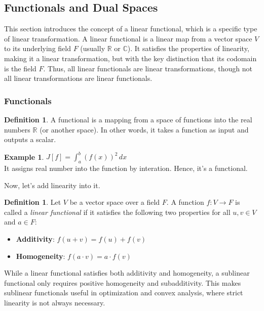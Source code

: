 \documentclass[12pt, reqno]{amsart}
\theoremstyle{definition}
\newtheorem{definition}[theorem]{Definition}
\newtheorem{example}[theorem]{Example}
\numberwithin{equation}{section}
\newcommand{\dR}{{\mathbb R}}
\begin{document}
\pagebreak
\subsection{Functionals and Dual Spaces}
This section introduces the concept of a linear functional, which is a specific type of linear transformation. A linear functional is a linear map from a vector space $V$ to its underlying field $F$ (usually $\dR$ or $\mathbb{C}$). It satisfies the properties of linearity, making it a linear transformation, but with the key distinction that its codomain is the field $F$. Thus, all linear functionals are linear transformations, though not all linear transformations are linear functionals.
\subsubsection{Functionals}
\begin{definition}
    A functional is a mapping from a space of functions into the real numbers $\dR$ (or another space). In other words, it takes a function as input and outputs a scalar.
\end{definition}
\begin{example}
    $J[f] = \int_a^b (f(x))^2 \, dx$\\
    It assigns real number into the function by interation. Hence, it's a functional.
\end{example}
Now, let's add linearity into it.
\begin{definition}
    Let $V$ be a vector space over a field $F$. A function $f: V \to F$ is called a \textit{linear functional} if it satisfies the following two properties for all $u, v \in V$ and $a \in F$:

\begin{itemize}
    \item \textbf{Additivity}: $f(u + v) = f(u) + f(v)$
    \item \textbf{Homogeneity}: $f(a \cdot v) = a \cdot f(v)$
\end{itemize}
\end{definition}

While a linear functional satisfies both additivity and homogeneity, a sublinear functional only requires positive homogeneity and subadditivity. This makes sublinear functionals useful in optimization and convex analysis, where strict linearity is not always necessary.
\end{document}
